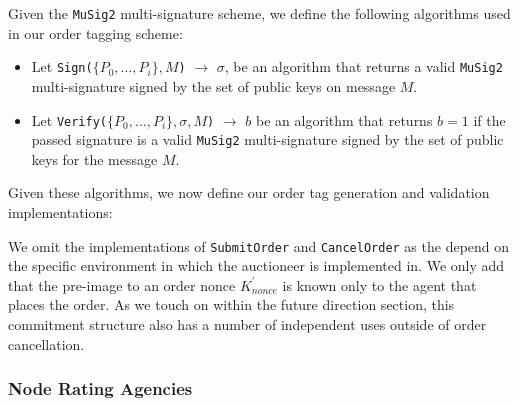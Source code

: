 \documentclass[10pt,a4paper]{article}
\theoremstyle{definition}
\begin{document}
Given the \texttt{MuSig2} multi-signature scheme, we define the following
algorithms used in our order tagging scheme:
\begin{itemize}
    \item Let \texttt{Sign($\{P_{0}, \dots, P_{i}\}, M$)} $\rightarrow$
        $\sigma$, be an algorithm that returns a valid \texttt{MuSig2}
        multi-signature signed by the set of public keys on message $M$.

    \item Let \texttt{Verify($\{P_{0}, \dots, P_{i}\}, \sigma, M$)}
        $\rightarrow$ $b$ be an algorithm that returns $b=1$ if the passed
        signature is a valid \texttt{MuSig2} multi-signature signed by the set
        of public keys for the message $M$.
\end{itemize}

Given these algorithms, we now define our order tag generation and validation
implementations:

\begin{pcvstack}[boxed,center, space=1em]

\end{pcvstack}

We omit the implementations of \texttt{SubmitOrder} and \texttt{CancelOrder} as
the depend on the specific environment in which the auctioneer is implemented
in. We only add that the pre-image to an order nonce $K_{nonce}^\prime$ is
known only to the agent that places the order. As we touch on within the future
direction section, this commitment structure also has a number of independent
uses outside of order cancellation.

\subsubsection{Node Rating Agencies}
\end{document}
